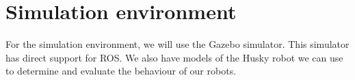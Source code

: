 \section{Simulation environment}
    For the simulation environment, we will use the Gazebo simulator. This simulator has direct support for ROS. We also have models of the Husky robot we can use to determine and evaluate the behaviour of our robots.
